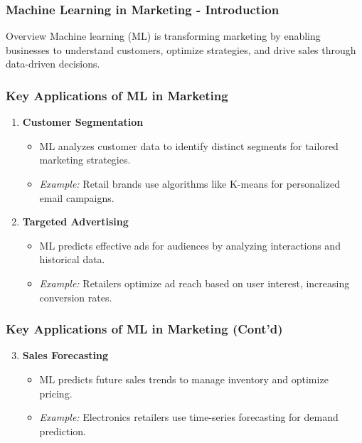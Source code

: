 \documentclass[aspectratio=169]{beamer}
\begin{document}
\begin{frame}[fragile]
    \frametitle{Machine Learning in Marketing - Introduction}
    \begin{block}{Overview}
        Machine learning (ML) is transforming marketing by enabling businesses to understand customers, optimize strategies, and drive sales through data-driven decisions.
    \end{block}
\end{frame}

\begin{frame}[fragile]
    \frametitle{Key Applications of ML in Marketing}
    \begin{enumerate}
        \item \textbf{Customer Segmentation}
            \begin{itemize}
                \item ML analyzes customer data to identify distinct segments for tailored marketing strategies.
                \item \textit{Example:} Retail brands use algorithms like K-means for personalized email campaigns.
            \end{itemize}
        \item \textbf{Targeted Advertising}
            \begin{itemize}
                \item ML predicts effective ads for audiences by analyzing interactions and historical data.
                \item \textit{Example:} Retailers optimize ad reach based on user interest, increasing conversion rates.
            \end{itemize}
    \end{enumerate}
\end{frame}

\begin{frame}[fragile]
    \frametitle{Key Applications of ML in Marketing (Cont'd)}
    \begin{enumerate}
        \setcounter{enumi}{2}
        \item \textbf{Sales Forecasting}
            \begin{itemize}
                \item ML predicts future sales trends to manage inventory and optimize pricing.
                \item \textit{Example:} Electronics retailers use time-series forecasting for demand prediction.
            \end{itemize}
    \end{enumerate}
\end{frame}
\end{document}

